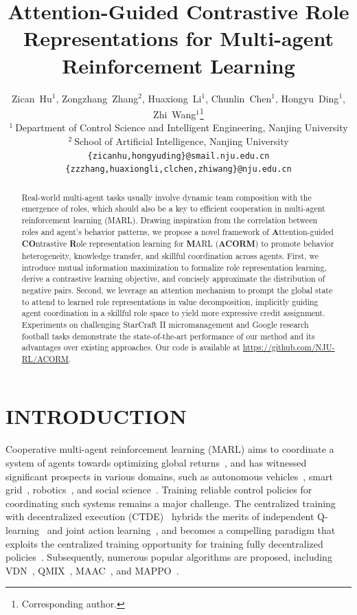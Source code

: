 \documentclass{article} %
\title{Attention-Guided Contrastive Role Representations for Multi-agent Reinforcement Learning}
\author{
Zican~Hu$^1$, Zongzhang~Zhang$^2$, Huaxiong~Li$^1$, Chunlin~Chen$^1$, Hongyu~Ding$^1$, Zhi~Wang$^{1}$\thanks{Corresponding author.}\vspace{0.2em}\\
\normalsize $^1~$Department of Control Science and Intelligent Engineering, Nanjing University \\
\normalsize $^2~$School of Artificial Intelligence, Nanjing University\\
\texttt{\{zicanhu,hongyuding\}@smail.nju.edu.cn}\\
\texttt{\{zzzhang,huaxiongli,clchen,zhiwang\}@nju.edu.cn}
}
\begin{document}
\maketitle

\begin{abstract}
Real-world multi-agent tasks usually involve dynamic team composition with the emergence of roles, which should also be a key to efficient cooperation in multi-agent reinforcement learning (MARL). Drawing inspiration from the correlation between roles and agent's behavior patterns, we propose a novel framework of \textbf{A}ttention-guided \textbf{CO}ntrastive \textbf{R}ole representation learning for \textbf{M}ARL (\textbf{ACORM}) to promote behavior heterogeneity, knowledge transfer, and skillful coordination across agents. First, we introduce mutual information maximization to formalize role representation learning, derive a contrastive learning objective, and concisely approximate the distribution of negative pairs. Second, we leverage an attention mechanism to prompt the global state to attend to learned role representations in value decomposition, implicitly guiding agent coordination in a skillful role space to yield more expressive credit assignment. Experiments on challenging StarCraft II micromanagement and Google research football tasks demonstrate the state-of-the-art performance of our method and its advantages over existing approaches. Our code is available at \href{https://github.com/NJU-RL/ACORM}{https://github.com/NJU-RL/ACORM}.
\end{abstract}



\section{INTRODUCTION}
Cooperative multi-agent reinforcement learning (MARL) aims to coordinate a system of agents towards optimizing global returns~\citep{vinyals2019grandmaster}, and has witnessed significant prospects in various domains, such as autonomous vehicles~\citep{zhou2020smarts}, smart grid~\citep{chen2021powernet}, robotics~\citep{yu2023asynchronous}, and social science~\citep{leibo2017multi}.
Training reliable control policies for coordinating such systems remains a major challenge.
The centralized training with decentralized execution (CTDE)~\citep{foerster2016learning} hybrids the merits of independent Q-learning~\citep{foerster2017stabilising} and joint action learning~\citep{sukhbaatar2016learning}, and becomes a compelling paradigm that exploits the centralized training opportunity for training fully decentralized policies~\citep{wang2023more}.
Subsequently, numerous popular algorithms are proposed, including VDN~\citep{sunehag2018value}, QMIX~\citep{rashid2020monotonic}, MAAC~\citep{iqbal2019actor}, and MAPPO~\citep{yu2022surprising}.
\end{document}
